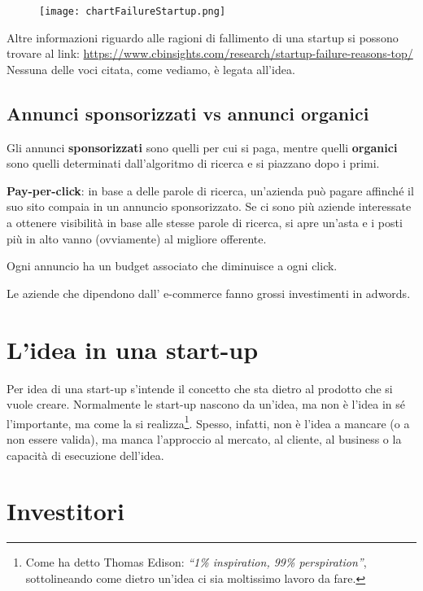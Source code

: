\begin{figure}[H]
\texttt{[image: chartFailureStartup.png]}
\end{figure}

Altre informazioni riguardo alle ragioni di fallimento di una startup si possono
trovare al link:
\url{https://www.cbinsights.com/research/startup-failure-reasons-top/}
Nessuna delle voci citata, come vediamo, è legata all'idea.

\subsection{Annunci sponsorizzati vs annunci organici}

Gli annunci \textbf{sponsorizzati} sono quelli per cui si paga, mentre quelli
\textbf{organici} sono quelli determinati dall'algoritmo di ricerca e si
piazzano dopo i primi.

\textbf{Pay-per-click}: in base a delle parole di ricerca, un'azienda può pagare
affinché il suo sito compaia in un annuncio sponsorizzato. Se ci sono più
aziende interessate a ottenere visibilità in base alle stesse parole di
ricerca, si apre un'asta e i posti più in alto vanno (ovviamente) al migliore
offerente.

Ogni annuncio ha un budget associato che diminuisce a ogni click.

Le aziende che dipendono dall' e-commerce fanno grossi investimenti in adwords.

\section{L'idea in una start-up}

Per idea di una start-up s'intende il concetto che sta dietro al prodotto che
si vuole creare. Normalmente le start-up nascono da un'idea, ma non è l'idea in
sé l'importante, ma come la si realizza\footnote{Come ha detto Thomas Edison:
\emph{``1\% inspiration, 99\% perspiration''}, sottolineando come dietro un'idea
ci sia moltissimo lavoro da fare.}. Spesso, infatti, non è l'idea a mancare
(o a non essere valida), ma manca l'approccio al mercato, al cliente, al 
business o la capacità di esecuzione dell'idea.

\section{Investitori}

